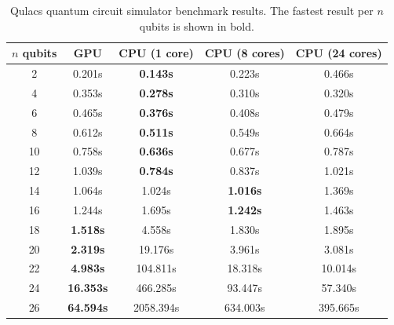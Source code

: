 \documentclass[a4paper,10pt]{article}
\begin{document}
\begin{appendices}
\begin{table}[ht]
	\centering
	{\renewcommand{\arraystretch}{1.1}
		\begin{tabular}{ c|c|c|c|c } 
			\hline
			$n$ qubits & GPU & CPU (1 core) & CPU (8 cores) &  CPU (24 cores) \\
			\hline
			2 & 0.201s & \textbf{0.143s} & 0.223s & 0.466s \\
			4 & 0.353s & \textbf{0.278s} & 0.310s & 0.320s \\
			6 & 0.465s & \textbf{0.376s} & 0.408s & 0.479s \\
			8 & 0.612s & \textbf{0.511s} & 0.549s & 0.664s \\
			10 & 0.758s & \textbf{0.636s} & 0.677s & 0.787s \\
			12 & 1.039s & \textbf{0.784s} & 0.837s & 1.021s \\
			14 & 1.064s & 1.024s & \textbf{1.016s} & 1.369s \\
			16 & 1.244s & 1.695s & \textbf{1.242s} & 1.463s \\
			18 & \textbf{1.518s} & 4.558s & 1.830s & 1.895s \\
			20 & \textbf{2.319s} & 19.176s & 3.961s & 3.081s \\
			22 & \textbf{4.983s} & 104.811s & 18.318s & 10.014s \\
			24 & \textbf{16.353s} & 466.285s & 93.447s & 57.340s \\
			26 & \textbf{64.594s} & 2058.394s & 634.003s & 395.665s \\
			\hline
		\end{tabular}
	}
	\caption{Qulacs quantum circuit simulator benchmark results. The fastest result per $n$ qubits is shown in bold.}
	\label{table:qulacs_benchmark_results}
\end{table}

\end{appendices}
\end{document}
